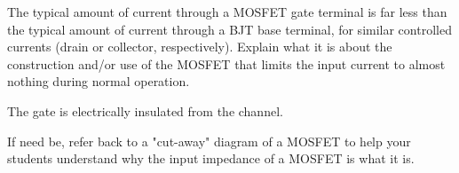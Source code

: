 


The typical amount of current through a MOSFET gate terminal is far less than the typical amount of current through a BJT base terminal, for similar controlled currents (drain or collector, respectively).  Explain what it is about the construction and/or use of the MOSFET that limits the input current to almost nothing during normal operation.







The gate is electrically insulated from the channel.







If need be, refer back to a "cut-away" diagram of a MOSFET to help your students understand why the input impedance of a MOSFET is what it is.




